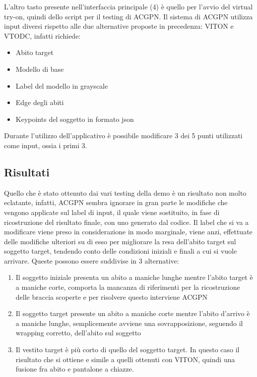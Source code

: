 \documentclass[final, 11pt]{article}
\begin{document}
	L’altro tasto presente nell’interfaccia principale (4) è quello per l’avvio del virtual try-on, quindi dello script per il testing di ACGPN.
	Il sistema di ACGPN utilizza input diversi rispetto alle due alternative proposte in precedenza: VITON e VTODC, infatti richiede:
	\begin{itemize}
		\item Abito target
		\item Modello di base
		\item Label del modello in grayscale
		\item Edge degli abiti
		\item Keypoints del soggetto in formato json
	\end{itemize}
	Durante l’utilizzo dell’applicativo è possibile modificare 3 dei 5 punti utilizzati come input, ossia i primi 3.
	
	\subsection{Risultati}
	Quello che è stato ottenuto dai vari testing della demo è un risultato non molto eclatante, infatti, ACGPN sembra ignorare in gran parte le modifiche che vengono applicate sul label di input, il quale viene sostituito, in fase di ricostruzione del risultato finale, con uno generato dal codice.
	Il label che si va a modificare viene preso in considerazione in modo marginale, viene anzi, effettuate delle modifiche ulteriori su di esso per migliorare la resa dell’abito target sul soggetto target, tendendo conto delle condizioni iniziali e finali a cui si vuole arrivare. 
	Queste possono essere suddivise in 3 alternative:
	\begin{enumerate}
		\item Il soggetto iniziale presenta un abito a maniche lunghe mentre l’abito target è a maniche corte, comporta la mancanza di riferimenti per la ricostruzione delle braccia scoperte e per risolvere questo interviene ACGPN
		\item Il soggetto target presente un abito a maniche corte mentre l’abito d’arrivo è a maniche lunghe, semplicemente avviene una sovrapposizione, seguendo il wrapping corretto, dell’abito sul soggetto
		\item Il vestito target è più corto di quello del soggetto target. In questo caso il risultato che si ottiene e simile a quelli ottenuti con VITON, quindi una fusione fra abito e pantalone a chiazze.
	\end{enumerate}
	
	
\end{document}
